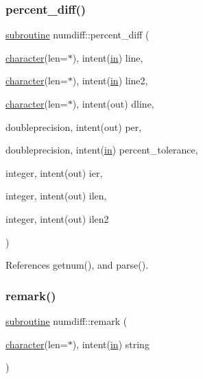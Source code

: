 \mbox{\label{numdiff_8f90_a3a10618690bb709040a044704b25ec7d}} 
\subsubsection{\texorpdfstring{percent\+\_\+diff()}{percent\_diff()}}
{\footnotesize\ttfamily \hyperlink{M__stopwatch_83_8txt_acfbcff50169d691ff02d4a123ed70482}{subroutine} numdiff\+::percent\+\_\+diff (\begin{DoxyParamCaption}\item[{\hyperlink{option__stopwatch_83_8txt_abd4b21fbbd175834027b5224bfe97e66}{character}(len=$\ast$), intent(\hyperlink{M__journal_83_8txt_afce72651d1eed785a2132bee863b2f38}{in})}]{line,  }\item[{\hyperlink{option__stopwatch_83_8txt_abd4b21fbbd175834027b5224bfe97e66}{character}(len=$\ast$), intent(\hyperlink{M__journal_83_8txt_afce72651d1eed785a2132bee863b2f38}{in})}]{line2,  }\item[{\hyperlink{option__stopwatch_83_8txt_abd4b21fbbd175834027b5224bfe97e66}{character}(len=$\ast$), intent(out)}]{dline,  }\item[{doubleprecision, intent(out)}]{per,  }\item[{doubleprecision, intent(\hyperlink{M__journal_83_8txt_afce72651d1eed785a2132bee863b2f38}{in})}]{percent\+\_\+tolerance,  }\item[{integer, intent(out)}]{ier,  }\item[{integer, intent(out)}]{ilen,  }\item[{integer, intent(out)}]{ilen2 }\end{DoxyParamCaption})}



References getnum(), and parse().

\mbox{\label{numdiff_8f90_ab59cb8434f0791b438eb140dd577e0cc}} 
\subsubsection{\texorpdfstring{remark()}{remark()}}
{\footnotesize\ttfamily \hyperlink{M__stopwatch_83_8txt_acfbcff50169d691ff02d4a123ed70482}{subroutine} numdiff\+::remark (\begin{DoxyParamCaption}\item[{\hyperlink{option__stopwatch_83_8txt_abd4b21fbbd175834027b5224bfe97e66}{character}(len=$\ast$), intent(\hyperlink{M__journal_83_8txt_afce72651d1eed785a2132bee863b2f38}{in})}]{string }\end{DoxyParamCaption})}


